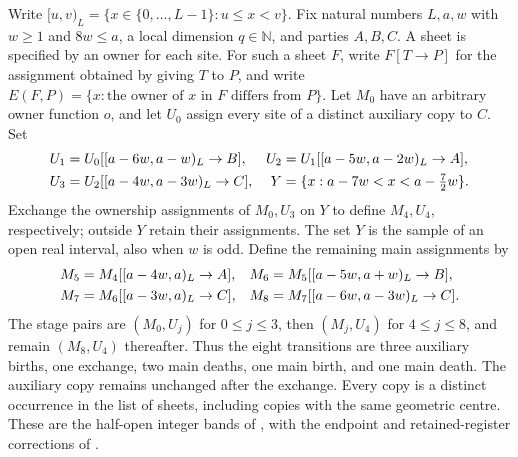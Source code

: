 \begin{definition}
    \label{def:chain_one_band_assignments}
    \leanok
    Write $[u,v)_L=\{x\in\{0,\ldots,L-1\}:u\le x<v\}$.
    Fix natural numbers $L,a,w$ with $w\ge1$ and $8w\le a$, a local
    dimension $q\in\mathbb N$, and parties $A,B,C$.
    A sheet is specified by an owner for each site.
    For such a sheet $F$, write $F[T\to P]$ for the assignment obtained
    by giving $T$ to $P$, and write
    $E(F,P)=\{x:\text{the owner of }x\text{ in }F\text{ differs from }P\}$.
    Let $M_0$ have an arbitrary owner function $o$, and let $U_0$ assign
    every site of a distinct auxiliary copy to $C$. Set
    \begin{align}
        U_1 & =U_0[\lbrack a-6w,a-w)_L\to B],        &
        U_2 & =U_1[\lbrack a-5w,a-2w)_L\to A],\notag   \\
        U_3 & =U_2[\lbrack a-4w,a-3w)_L\to C],       &
        Y   & =\{x:a-7w<x<a-\tfrac72w\}.\notag
    \end{align}
    Exchange the ownership assignments of $M_0,U_3$ on $Y$ to define
    $M_4,U_4$, respectively; outside $Y$ retain their assignments.
    The set $Y$ is the sample of an open real interval, also when $w$ is odd.
    Define the remaining main assignments by
    \begin{align}
        M_5 & =M_4[\lbrack a-4w,a)_L\to A],          &
        M_6 & =M_5[\lbrack a-5w,a+w)_L\to B],\notag    \\
        M_7 & =M_6[\lbrack a-3w,a)_L\to C],          &
        M_8 & =M_7[\lbrack a-6w,a-3w)_L\to C].\notag
    \end{align}
    The stage pairs are $(M_0,U_j)$ for $0\le j\le3$, then
    $(M_j,U_4)$ for $4\le j\le8$, and remain $(M_8,U_4)$ thereafter.
    Thus the eight transitions are
    three auxiliary births, one exchange, two main deaths, one main birth,
    and one main death. The auxiliary copy remains unchanged after the exchange.
    Every copy is a distinct occurrence in the list of sheets, including
    copies with the same geometric centre.
    These are the half-open integer bands of
    \cite[Part~II, Construction~\texttt{con:band}]{TNLean2026OneDimensional},
    with the endpoint and retained-register corrections of
    \cite{gap:tnlean_one_dimensional_band_sweep_corrections}.
\end{definition}

